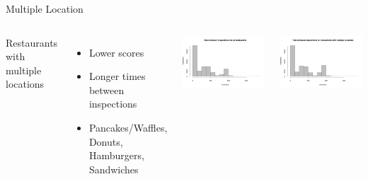 \documentclass[12pt]{beamer}
\begin{document}
\begin{frame}{Multiple Location}
\begin{columns}[C]
	\vfill
	Restaurants with multiple locations
	\begin{itemize}
		\item Lower scores
		\item Longer times between inspections
		\item Pancakes/Waffles, Donuts, Hamburgers, Sandwiches
	\end{itemize}
	\vfill
	\includegraphics[width=\textwidth]{plots/time_all}
	
	\includegraphics[width=\textwidth]{plots/time_multiple}
\end{columns}
\end{frame}
\end{document}
